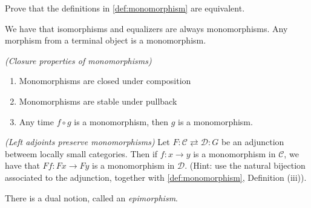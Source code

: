 \documentclass{article}[11pt]
\begin{document}
\begin{exercise} Prove that the definitions in \autoref{def:monomorphism} are equivalent.
\end{exercise}

\begin{example} We have that isomorphisms and equalizers are always monomorphisms. Any morphism from a terminal object is a monomorphism.
\end{example}

\begin{exercise} \textit{(Closure properties of monomorphisms)}
\begin{enumerate}
    \item Monomorphisms are closed under composition
    \item Monomorphisms are stable under pullback
    \item Any time $f\circ g$ is a monomorphism, then $g$ is a monomorphism.
\end{enumerate}
\end{exercise}

\begin{exercise}\label{exer:left-adjoints-preserve-monomorphisms} \textit{(Left adjoints preserve monomorphisms)} Let $F: \mathscr{C} \rightleftarrows \mathscr{D} : G$ be an adjunction betweem locally small categories. Then if $f: x\to y$ is a monomorphism in $\mathscr{C}$, we have that $Ff : Fx \to Fy$ is a monomorphism in $\mathscr{D}$. (Hint: use the natural bijection associated to the adjunction, together with \autoref{def:monomorphism}, Definition (iii)).
\end{exercise}

There is a dual notion, called an \textit{epimorphism}.
\end{document}
